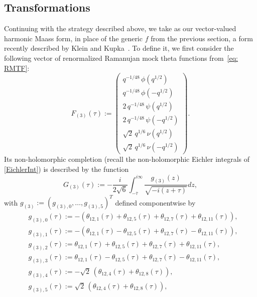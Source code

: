 \documentclass[11pt,reqno]{amsart}
\renewcommand{\=}{\;=\;}
\theoremstyle{myremark}
\begin{document}
\subsection{Transformations}\label{Transformations}
Continuing with the strategy described above, we take as our vector-valued harmonic Maass form, in place of the generic $f$ from the previous section, a form recently described by Klein and Kupka~\cite{KK}. 
To define it, we first consider the following vector of renormalized Ramanujan mock theta functions from~\eqref{eq: RMTF}:
\begin{equation}\label{eqn:F_(3)_def}
F_{(3)}(\tau):=
\begin{pmatrix}
q^{-1/48}\,\phi(q^{1/2})\\
q^{-1/48}\,\phi(-q^{1/2})\\
2\,q^{-1/48}\,\psi(q^{1/2})\\
2\,q^{-1/48}\,\psi(-q^{1/2})\\
\sqrt2\,q^{1/6}\,\nu(q^{1/2})\\
\sqrt2\,q^{1/6}\,\nu(-q^{1/2})
\end{pmatrix}.
\end{equation}
Its non-holomorphic completion (recall the non-holomorphic Eichler integrals of \eqref{EichlerInt}) is described by the function 
\begin{equation} \label{eqn:G_(3)_def}
G_{(3)}(\tau):=-\frac{i}{2\sqrt6}\int_{-\overline{\tau}}^{i\infty}\frac{g_{(3)}(z)}{\sqrt{-i(z+\tau)}}dz,
\end{equation}
with
$g_{(3)}:=(g_{(3),0},\ldots,g_{(3),5})^T$ defined componentwise by
\begin{equation} \label{eqn:g_(3)_components}
\begin{aligned}
&
g_{(3),0}(\tau):=-\left(\theta_{12,1}(\tau)+\theta_{12,5}(\tau)+\theta_{12,7}(\tau)+\theta_{12,11}(\tau)\right),
\\&
g_{(3),1}(\tau):=-\left(\theta_{12,1}(\tau)-\theta_{12,5}(\tau)+\theta_{12,7}(\tau)-\theta_{12,11}(\tau)\right),
\\&
g_{(3),2}(\tau):=\theta_{12,1}(\tau)+\theta_{12,5}(\tau)+\theta_{12,7}(\tau)+\theta_{12,11}(\tau),
\\&
g_{(3),3}(\tau):=\theta_{12,1}(\tau)-\theta_{12,5}(\tau)+\theta_{12,7}(\tau)-\theta_{12,11}(\tau),
\\&
g_{(3),4}(\tau):=-\sqrt2 \,\left(\theta_{12,4}(\tau)+\theta_{12,8}(\tau)\right),
\\&
g_{(3),5}(\tau):=\sqrt2 \,\left(\theta_{12,4}(\tau)+\theta_{12,8}(\tau)\right),
\end{aligned}
\end{equation}
\end{document}
